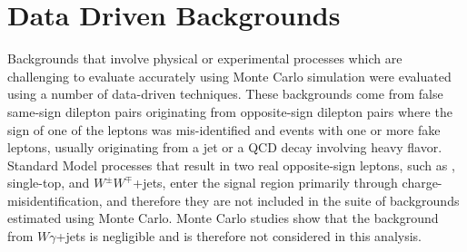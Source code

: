 \section{Data Driven Backgrounds}\label{sect:back}

Backgrounds that involve physical or experimental processes which are challenging to evaluate accurately using Monte Carlo simulation were evaluated using a number of data-driven techniques.
These backgrounds come from false same-sign dilepton pairs originating from opposite-sign dilepton pairs where the sign of one of the leptons was mis-identified and events with one or more fake leptons, usually originating from a jet or a QCD decay involving heavy flavor.
Standard Model processes that result in two real opposite-sign leptons, such as \ttbar, single-top, and $W^{\pm}W^{\mp}$+jets, enter the signal region primarily through charge-misidentification, and therefore they are not included in the suite of backgrounds estimated using Monte Carlo.
Monte Carlo studies show that the background from $W\gamma$+jets is negligible and is therefore not considered in this analysis.

